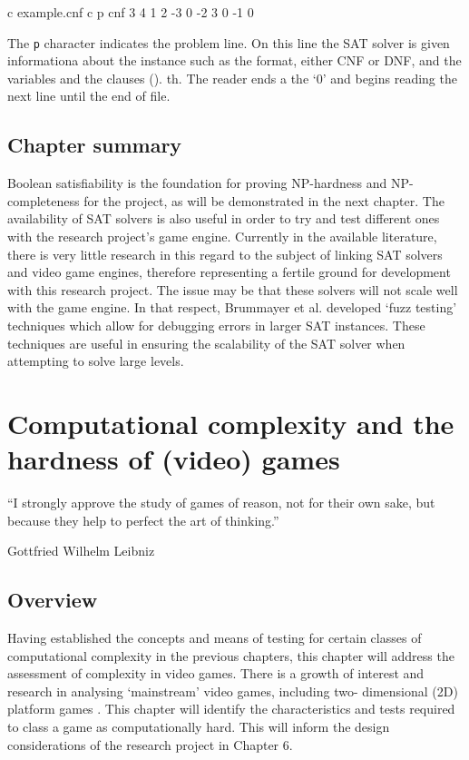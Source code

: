 \documentclass[11pt, a4paper, oneside]{report} %
\begin{document}
c example.cnf
c
p cnf 3 4
 1  2 -3 0 
-2  3    0 
-1       0 


The \texttt{p} character indicates the problem line. On this line the SAT solver
is given informationa about the instance such as the format, either CNF or DNF,
and the variables  {} and the clauses (). th. The reader ends a the `0' and
begins reading the next line until the end of file.


\section{Chapter summary}

Boolean satisfiability is the foundation for proving NP-hardness and NP-
completeness for the project, as will be demonstrated in the next chapter. The
availability of SAT solvers is also useful in order to try and test different
ones with the research project's game engine. Currently in the available
literature, there is very little research in this regard to the subject of
linking SAT solvers and video game engines, therefore representing a fertile
ground for development with this research project. The issue may be that these
solvers will not scale well with the game engine. In that respect, Brummayer et
al. \cite{brummayer2010automated} developed `fuzz testing' techniques which
allow for debugging errors in larger SAT instances. These techniques are useful
in ensuring the scalability of the SAT solver when attempting to solve large
levels.





\chapter{Computational complexity and the hardness of (video) games}

\epigraph{``I strongly approve the study of games of reason, not for their own
sake, but because they help to perfect the art of thinking.''}{Gottfried
Wilhelm Leibniz}

\section{Overview}

Having established the concepts and means of testing for certain classes of
computational complexity in the previous chapters, this chapter will address the
assessment of complexity in video games. There is a growth of interest and
research in analysing `mainstream' video games, including two- dimensional (2D)
platform games  \cite{viglietta2014gaming, DBLP:conf/fun/Forisek10, Aloupis2012,
Smith:2008:FAP:1401843.1401858}. This chapter will identify the characteristics
and tests required to class a game as computationally hard. This will inform the
design considerations of the research project in Chapter 6.
\end{document}
